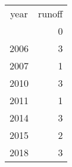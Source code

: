 \footnotesize\begin{tabular}[t]{lr}
\toprule
\multicolumn{1}{c}{year} & \multicolumn{1}{c}{runoff} \\
\cmidrule(l{3pt}r{3pt}){1-1} \cmidrule(l{3pt}r{3pt}){2-2}
  & 0\\
\midrule
2006 & 3\\
2007 & 1\\
2010 & 3\\
2011 & 1\\
2014 & 3\\
2015 & 2\\
2018 & 3\\
\bottomrule
\end{tabular}
